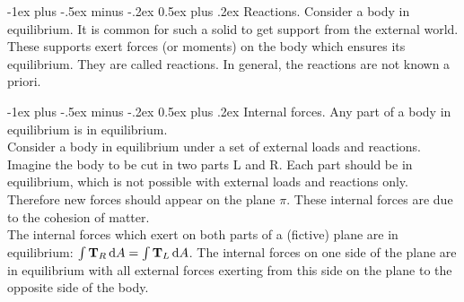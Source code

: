 \documentclass[10pt,landscape,a4paper]{article}
\makeatletter
\renewcommand\d{\mathop{}\!\mathrm{d}}
\renewcommand{\section}{\@startsection{section}{1}{0mm}%
	{-1ex plus -.5ex minus -.2ex}%
	{0.5ex plus .2ex}%
	{\normalfont\large\bfseries}}
\makeatother
\begin{document}
\begin{multicols}{3}
	\section{Reactions.}
	Consider a body in equilibrium.
	It is common for such a solid to get support from the external world.
	These supports exert forces (or moments) on the body which ensures its equilibrium.
	They are called reactions.
	In general, the reactions are not known a priori.
	
	\section{Internal forces.}
	Any part of a body in equilibrium is in equilibrium.\\
	Consider a body in equilibrium under a set of external loads and reactions.
	Imagine the body to be cut in two parts L and R.
	Each part should be in equilibrium, which is not possible with external loads and reactions only.
	Therefore new forces should appear on the plane $ \pi $.
	These internal forces are due to the cohesion of matter.\\
	The internal forces which exert on both parts of a (fictive) plane are in equilibrium: $ \int{\vb{T}_R\d A} = \int{\vb{T}_L\d A} $.
	The internal forces on one side of the plane are in equilibrium with all external forces exerting from this side on the plane to the opposite side of the body.
	

\end{multicols}
\end{document}
